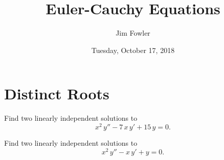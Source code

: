 \documentclass{homework}
\author{Jim Fowler}
\title{Euler-Cauchy Equations}
\date{Tuesday, October 17, 2018}
\begin{document}
\maketitle

\newenvironment{truefalse}{\begin{problem}}{\hfill \textsf{True\quad False}\end{problem}}

\section{Distinct Roots}

\begin{problem}
  Find two linearly independent solutions to
  \[
    x^2 \, y'' - 7 \, x \, y' + 15 \, y = 0.
  \]
\end{problem}


\begin{problem}
  Find two linearly independent solutions to
  \[
    x^2 \, y'' - x \, y' + y = 0.
  \]
\end{problem}














\end{document}
